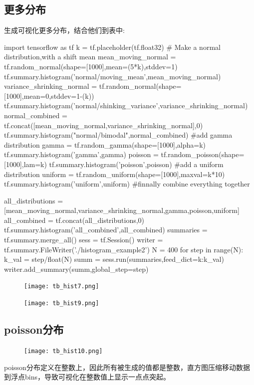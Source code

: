 \subsection{更多分布}
生成可视化更多分布，结合他们到表中:
\begin{python}
import tensorflow as tf
k = tf.placeholder(tf.float32)
# Make a normal distribution,with a shift mean
mean_moving_normal = tf.random_normal(shape=[1000],mean=(5*k),stddev=1)
tf.summary.histogram('normal/moving_mean',mean_moving_normal)
variance_shrinking_normal = tf.random_normal(shape=[1000],mean=0,stddev=1-(k))
tf.summary.histogram('normal/shinking_variance',variance_shrinking_normal)
normal_combined = tf.concat([mean_moving_normal,variance_shrinking_normal],0)
tf.summary.histogram("normal/bimodal",normal_combined)
#add gamma distribution
gamma = tf.random_gamma(shape=[1000],alpha=k)
tf.summary.histogram('gamma',gamma)
poisson = tf.random_poisson(shape=[1000],lam=k)
tf.summary.histogram('poisson',poisson)
#add a uniform distribution
uniform = tf.random_uniform(shape=[1000],maxval=k*10)
tf.summary.histogram('uniform',uniform)
#finnally combine everything together

all_distributions = [mean_moving_normal,variance_shrinking_normal,gamma,poisson,uniform]
all_combined = tf.concat(all_distributions,0)
tf.summary.histogram('all_combined',all_combined)
summaries = tf.summary.merge_all()
sess = tf.Session()
writer = tf.summary.FileWriter('./histogram_example2')
N = 400
for step in range(N):
    k_val = step/float(N)
    summ = sess.run(summaries,feed_dict={k:k_val})
    writer.add_summary(summ,global_step=step)
\end{python}
\begin{center}
\begin{figure}[H]
\texttt{[image: tb\_hist7.png]}
\end{figure}
\end{center}
\begin{center}
\begin{figure}
\texttt{[image: tb\_hist9.png]}
\end{figure}
\end{center}
\subsection{poisson分布}
\begin{center}
\begin{figure}[H]
\texttt{[image: tb\_hist10.png]}
\end{figure}
\end{center}
poisson分布定义在整数上，因此所有被生成的值都是整数，直方图压缩移动数据到浮点bins，导致可视化在整数值上显示一点点突起。
